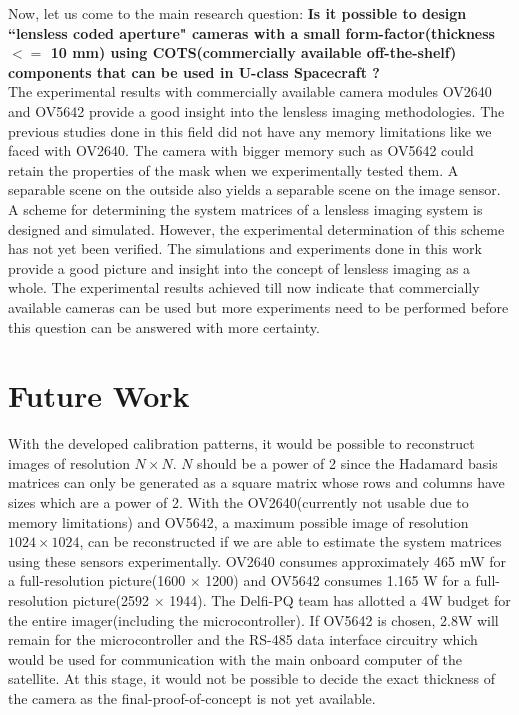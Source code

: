 Now, let us come to the main research question:
\textbf{Is it possible to design ``lensless coded aperture" cameras with a small form-factor(thickness $<=$ 10 mm) using COTS(commercially available off-the-shelf) components that can be used in U-class Spacecraft ?}\\
The experimental results with commercially available camera modules OV2640 and OV5642 provide a good insight into the lensless imaging methodologies. The previous studies done in this field did not have any memory limitations like we faced with OV2640. The camera with bigger memory such as OV5642 could retain the properties of the mask when we experimentally tested them. A separable scene on the outside also yields a separable scene on the image sensor. A scheme for determining the system matrices of a lensless imaging system is designed and simulated. However, the experimental determination of this scheme has not yet been verified. The simulations and experiments done in this work provide a good picture and insight into the concept of lensless imaging as a whole. The experimental results achieved till now indicate that commercially available cameras can be used but more experiments need to be performed before this question can be answered with more certainty. 

\section{Future Work}
With the developed calibration patterns, it would be possible to reconstruct images of resolution $N \times N$. $N$ should be a power of 2 since the Hadamard basis matrices can only be generated as a square matrix whose rows and columns have sizes which are a power of 2. With the OV2640(currently not usable due to memory limitations) and OV5642, a maximum possible image of resolution $1024 \times 1024$, can be reconstructed if we are able to estimate the system matrices using these sensors experimentally. OV2640 consumes approximately 465 mW for a full-resolution picture(1600 $\times$ 1200) and OV5642 consumes 1.165 W for a full-resolution picture(2592 $\times$ 1944). The Delfi-PQ team has allotted a 4W budget for the entire imager(including the microcontroller). If OV5642 is chosen, 2.8W will remain for the microcontroller and the RS-485 data interface circuitry which would be used for communication with the main onboard computer of the satellite. At this stage, it would not be possible to decide the exact thickness of the camera as the final-proof-of-concept is not yet available.

